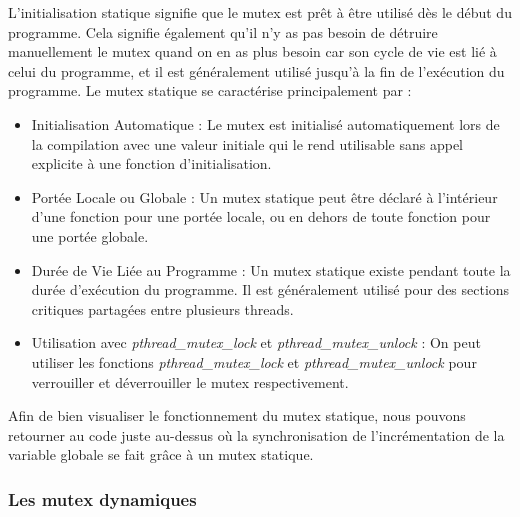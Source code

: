L'initialisation statique signifie que le mutex est prêt à être utilisé dès le début du programme. Cela signifie également qu'il n'y as pas besoin de détruire manuellement le mutex quand on en as plus besoin car son cycle de vie est lié à celui du programme, et il est généralement utilisé jusqu'à la fin de l'exécution du programme. Le mutex statique se caractérise principalement par :
\\
\begin{itemize}
    \item Initialisation Automatique : Le mutex est initialisé automatiquement lors de la compilation avec une valeur initiale qui le rend utilisable sans appel explicite à une fonction d'initialisation.
    \\
    \item Portée Locale ou Globale : Un mutex statique peut être déclaré à l'intérieur d'une fonction pour une portée locale, ou en dehors de toute fonction pour une portée globale.
    \\
    \item Durée de Vie Liée au Programme : Un mutex statique existe pendant toute la durée d'exécution du programme. Il est généralement utilisé pour des sections critiques partagées entre plusieurs threads.
    \\
    \item Utilisation avec \textit{pthread\_mutex\_lock} et \textit{pthread\_mutex\_unlock} : On peut utiliser les fonctions \textit{pthread\_mutex\_lock} et \textit{pthread\_mutex\_unlock} pour verrouiller et déverrouiller le mutex respectivement.
\end{itemize}
\vspace{\baselineskip}

Afin de bien visualiser le fonctionnement du mutex statique, nous pouvons retourner au code juste au-dessus où la synchronisation de l'incrémentation de la variable globale se fait grâce à un mutex statique.

\subsubsection{Les mutex dynamiques}

